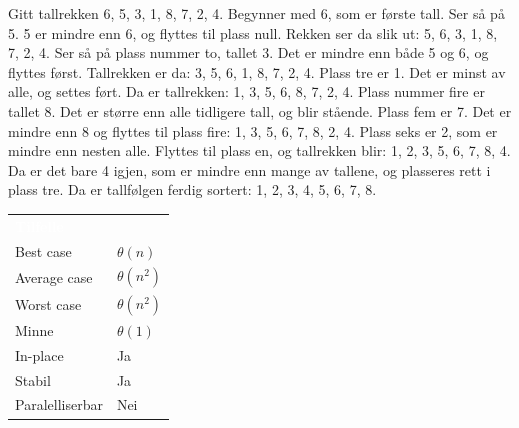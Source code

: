 \begin{boxed}
Gitt tallrekken 6, 5, 3, 1, 8, 7, 2, 4. Begynner med 6, som er første tall. Ser så på 5. 5 er mindre enn 6, og flyttes til plass null. Rekken ser da slik ut: 5, 6, 3, 1, 8, 7, 2, 4. Ser så på plass nummer to, tallet 3. Det er mindre enn både 5 og 6, og flyttes først. Tallrekken er da: 3, 5, 6, 1, 8, 7, 2, 4. Plass tre er 1. Det er minst av alle, og settes ført. Da er tallrekken: 1, 3, 5, 6, 8, 7, 2, 4. Plass nummer fire er tallet 8. Det er større enn alle tidligere tall, og blir stående. Plass fem er 7. Det er mindre enn 8 og flyttes til plass fire: 1, 3, 5, 6, 7, 8, 2, 4. Plass seks er 2, som er mindre enn nesten alle. Flyttes til plass en, og tallrekken blir: 1, 2, 3, 5, 6, 7, 8, 4. Da er det bare 4 igjen, som er mindre enn mange av tallene, og plasseres rett i plass tre. Da er tallfølgen ferdig sortert: 1, 2, 3, 4, 5, 6, 7, 8.
\end{boxed}

\begin{table}[H]
    \label{tab:bubblesort}
    \centering
    \begin{tabular}{|L{15em} | L{15em}|}
        \hline
        \textbf{\textcolor{white}{Tilfelle}} & \textbf{\textcolor{white}{}}\\
        Best case & $\theta(n)$\\
        Average case & $\theta(n^2)$\\
        Worst case & $\theta(n^2)$\\
        Minne & $\theta(1)$\\
        In-place & Ja\\
        Stabil & Ja\\
        Paralelliserbar & Nei\\
         \hline
    \end{tabular}
\end{table}

